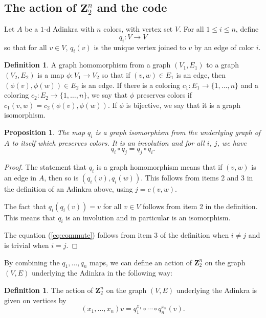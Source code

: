 \documentclass[12pt,twoside,singlespace]{article}
\numberwithin{equation}{section}
\newtheorem{prop}[equation]{Proposition}
\theoremstyle{definition}
\newtheorem{definition}[equation]{Definition}
\newcommand{\ZZ}{\mathbf{Z}}
\begin{document}
\subsection{The action of $\ZZ_2^n$ and the code}
Let $A$ be a $1$-d Adinkra with $n$ colors, with vertex set $V$.  For all $1\le i\le n$, define
\[q_i:V\to V\]
so that for all $v\in V$, $q_i(v)$ is the unique vertex joined to $v$ by an edge of color $i$.

\begin{definition}
\label{defn:homomorphism}
A graph homomorphism from a graph $(V_1,E_1)$ to a graph $(V_2,E_2)$ is a map $\phi:V_1\to V_2$ so that if $(v,w)\in E_1$ is an edge, then $(\phi(v),\phi(w))\in E_2$ is an edge.  If there is a coloring $c_1:E_1\to\{1,\ldots,n\}$ and a coloring $c_2:E_2\to\{1,\ldots,n\}$, we say that $\phi$ preserves colors if $c_1(v,w)=c_2(\phi(v),\phi(w))$.  If $\phi$ is bijective, we say that it is a graph isomorphism.
\end{definition}

\begin{prop}
\label{prop:qmap}
The map $q_i$ is a graph isomorphism from the underlying graph of $A$ to itself which preserves colors.  It is an involution and for all $i$, $j$, we have
\begin{equation}
q_i\circ q_j=q_j\circ q_i.\label{eq:commute}
\end{equation}
\end{prop}
\begin{proof}
The statement that $q_i$ is a graph homomorphism means that if $(v,w)$ is an edge in $A$, then so is $(q_i(v),q_i(w))$.  This follows from items 2 and 3 in the definition of an Adinkra above, using $j=c(v,w)$.

The fact that $q_i(q_i(v))=v$ for all $v\in V$ follows from item 2 in the definition.  This means that $q_i$ is an involution and in particular is an isomorphism.

The equation (\ref{eq:commute}) follows from item 3 of the definition when $i\not=j$ and is trivial when $i=j$.
\end{proof}

By combining the $q_1,\ldots, q_n$ maps, we can define an action of $\ZZ_2^n$ on the graph $(V,E)$ underlying the Adinkra in the following way:
\begin{definition}
The action of $\ZZ_2^n$ on the graph $(V,E)$ underlying the Adinkra is given on vertices by
\[(x_1,\ldots,x_n)v=q_1^{x_1}\circ\cdots\circ q_n^{x_n}(v).\]
\end{definition}
\end{document}
